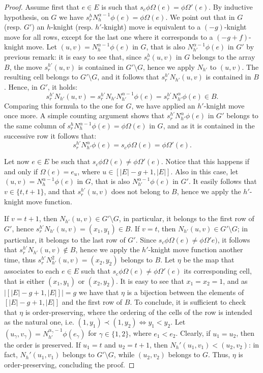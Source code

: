 \documentclass[10pt,a4paper]{amsart}
\begin{document}
\begin{proof}
 
Assume first that $e \in E$ is such that $s_c \phi\Omega (e)  =\phi \Omega'(e)$.  By inductive hypothesis, on $G$ we have $ s_r^hN_h^{\alpha-1} \phi (e) = \phi\Omega(e)$. 
We point out that in $G$  (resp. $G'$) an $h$-knight (resp. $h'$-knight) move is equivalent to a $(-g)$-knight move for all rows, except for the last one where it corresponds to a $(-g+f)$-knight move.
Let $(u,v) = N_h^{\alpha-1} \phi (e)$ in $G$, that is also $N_{h'}^{\alpha-1} \phi (e)$ in $G'$ by previous remark: it is easy to see that, since $s_r^h(u,v)$ in $G$ belongs to the array $B$, the move $s_r^{h'}(u,v)$ is contained in $G' \setminus G$, hence we apply $N_{h'}$ to $(u,v)$. The resulting cell belongs to $G' \setminus G$, and it follows that $s_r^{h'}N_{h'}(u,v)$ is contained in $B$. Hence, in $G'$, it holds:
\[
s_r^{h'}N_{h'}(u,v) = s_r^{h'}N_{h'}N_{h'}^{\alpha-1}\phi(e) =  s_r^{h'}N_{h'}^{\alpha}\phi(e)  \in B.
\] 
Comparing this formula to the one  for $G$, we have applied  an $h'$-knight move once more. A simple counting argument shows that $s_r^{h'}N_{h'}^{\alpha}\phi(e)$ in $G'$ belongs to the same column of  $ s_r^hN_h^{\alpha-1} \phi (e) = \phi\Omega(e)$ in $G$, and as it is contained in the successive row it follows that:
 \[
 s_r^{h'}N_{h'}^{\alpha}\phi(e) = s_c \phi\Omega (e)  =\phi \Omega'(e).
 \]

Let now $e \in E$ be such that $s_c \phi\Omega (e)  \neq \phi \Omega'(e)$. Notice that this happens if and only if  $\Omega (e) = e_u$, where $u \in[|E|-g+1,|E|]$. Also in this case, let $(u,v) =N_h^{\alpha-1}	\phi(e)$ in $G$, that is also $N_{h'}^{\alpha-1}\phi(e)$ in $G'$. It easily follows that $v \in \{t,t+1\}$, and that $s_r^{h'}(u,v)$ does not belong to $B$, hence we apply the $h'$-knight move function.

If $v = t+1$, then $N_{h'}(u,v) \in G' \setminus G$, in particular, it belongs to the first row of $G'$, hence $s_r^{h'}N_{h'}(u,v) = (x_1,y_1) \in B$. 
If $v = t$, then $N_{h'}(u,v) \in G' \setminus G$; in particular, it belongs to the last row of $G'$. Since $s_c \phi\Omega (e)  \neq \phi \Omega'e)$, it follows that $s_r^{h'}N_{h'}(u,v) \not\in B$, hence we apply the $h'$-knight move function another time, thus $s_r^{h'} N^2_{h'}(u,v) = (x_2,y_2)$ belongs to $B$. Let $\eta $ be the map that associates to each $e \in E $  such that $s_c \phi\Omega (e)  \neq \phi \Omega'(e)$ its corresponding cell, that is either $(x_1,y_1)$ or $(x_2,y_2)$.
It is easy to see that $x_1 = x_2 = 1$, and as $|[|E|-g+1,|E|]| = g$ we have that $\eta$ is a bijection between the elements of $[|E|-g+1,|E|]$ and the first row of $B$. To conclude, it is sufficient to check that $\eta$ is order-preserving, where the ordering of the cells of the row is intended as the natural one, i.e. $(1,y_1) \prec (1,y_2) \Leftrightarrow y_1 <y_2$. 
Let $(u_\gamma,v_\gamma) = N_{h'}^{\alpha_\gamma-1}\phi(e_\gamma)$ for $\gamma \in \{1,2\}$, where $e_1 < e_2$. Clearly, if $u_1 = u_2$, then  the order is preserved. If $u_1 = t$ and $u_2 = t+1$, then $N_h'(u_1,v_1) < (u_2,v_2)$: in fact, $N_h'(u_1,v_1)$ belongs to $G' \setminus G$, while $(u_2,v_2)$ belongs to $G$.
Thus, $\eta$ is order-preserving, concluding the proof.
\end{proof}
\end{document}
